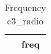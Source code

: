 \begin{table}[htbp]\centering
\def\sym#1{\ifmmode^{#1}\else\(^{#1}\)\fi}
\caption{Frequency c3\_radio \label{tab:"label"}}
\begin{tabular*}{0.9\hsize}{@{\hskip\tabcolsep\extracolsep\fill}l*{1}{c}}
\toprule
                                &     freq\\
\midrule
\bottomrule
\end{tabular*}
\end{table}

